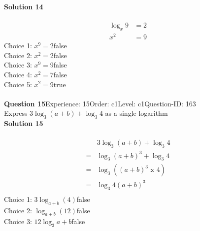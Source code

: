 \documentclass{article}
\begin{document}
\noindent\textbf{Solution 14}\\[2pt]
\\[-35pt]\begin{align*}
\log_x9&=2\\[2pt]
x^2&=9
\end{align*}
Choice 1: \hspace{20pt}$x^9=2$\hspace{20pt}false\\
Choice 2: \hspace{20pt}$x^2=2$\hspace{20pt}false\\
Choice 3: \hspace{20pt}$x^9=9$\hspace{20pt}false\\
Choice 4: \hspace{20pt}$x^2=7$\hspace{20pt}false\\
Choice 5: \hspace{20pt}$x^2=9$\hspace{20pt}true\\
\\[4pt]
\noindent\textbf{Question 15}\hspace{20pt}Experience: 15\hspace{20pt}Order: c1\hspace{20pt}Level: c1\hspace{20pt}Question-ID: 163\\[2pt]
Express $3\log_{3}(a+b)+\log_{3}4$ as a single logarithm\\[4pt]
\noindent\textbf{Solution 15}\\[2pt]
\\[-35pt]\begin{align*}
&3\log_{3}(a+b)+\log_{3}4\\[2pt]
=&\log_{3}(a+b)^3+\log_{3}4\\[2pt]
=&\log_{3}((a+b)^3 \,\, \text{x} \,\, 4)\\[2pt]
=&\log_{3}4(a+b)^3\\[-80pt]
\end{align*}
Choice 1: \hspace{20pt}$3\log_{a+b}(4)$\hspace{20pt}false\\
Choice 2: \hspace{20pt}$\log_{a+b}(12)$\hspace{20pt}false\\
Choice 3: \hspace{20pt}$12\log_{3}a+b$\hspace{20pt}false\\
\end{document}

